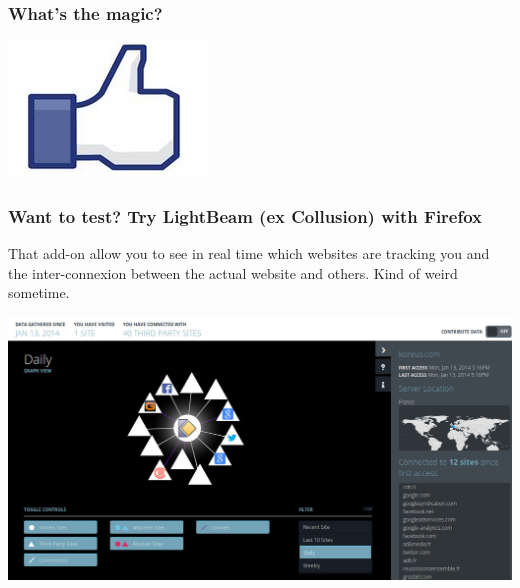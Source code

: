 \begin{frame}
\frametitle{What's the magic?}

\begin{center}
\includegraphics[scale=0.3] {./materials/Facebook_like.png}
\end{center}
\end{frame}

\begin{frame}
\frametitle{Want to test? Try LightBeam (ex Collusion) with Firefox}
That add-on allow you to see in real time which websites are tracking you
and the inter-connexion between the actual website and others. Kind of weird
sometime.
\begin{center}
\includegraphics[scale=0.3] {./materials/lightbeam}
\end{center}
\end{frame}


